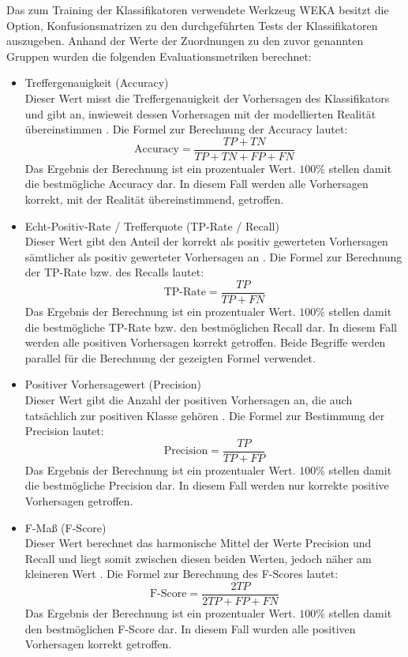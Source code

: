 Das zum Training der Klassifikatoren verwendete Werkzeug WEKA besitzt die Option, Konfusionsmatrizen zu den durchgeführten Tests der Klassifikatoren auszugeben. Anhand der Werte der Zuordnungen zu den zuvor genannten Gruppen wurden die folgenden Evaluationsmetriken berechnet: 

\begin{itemize}
\item Treffergenauigkeit (Accuracy)
\\Dieser Wert misst die Treffergenauigkeit der Vorhersagen des Klassifikators und gibt an, inwieweit dessen Vorhersagen mit der modellierten Realität übereinstimmen \cite{Sammut2017}. Die Formel zur Berechnung der Accuracy lautet:
\\\[\text{Accuracy} = \frac{TP+TN}{TP+TN+FP+FN}\]
Das Ergebnis der Berechnung ist ein prozentualer Wert. $100\%$ stellen damit die bestmögliche Accuracy dar. In diesem Fall werden alle Vorhersagen korrekt, mit der Realität übereinstimmend, getroffen.
\item Echt-Positiv-Rate / Trefferquote (TP-Rate / Recall)
\\Dieser Wert gibt den Anteil der korrekt als positiv gewerteten Vorhersagen sämtlicher als positiv gewerteter Vorhersagen an \cite{Alpaydin2010}. Die Formel zur Berechnung der TP-Rate bzw. des Recalls lautet:
\\\[\text{TP-Rate} = \frac{TP}{TP+FN}\]
Das Ergebnis der Berechnung ist ein prozentualer Wert. $100\%$ stellen damit die bestmögliche TP-Rate bzw. den bestmöglichen Recall dar. In diesem Fall werden alle positiven Vorhersagen korrekt getroffen. Beide Begriffe werden parallel für die Berechnung der gezeigten Formel verwendet.
\item Positiver Vorhersagewert (Precision)
\\ Dieser Wert gibt die Anzahl der positiven Vorhersagen an, die auch tatsächlich zur positiven Klasse gehören \cite{Sammut2017}. Die Formel zur Bestimmung der Precision lautet:
\\\[\text{Precision} = \frac{TP}{TP+FP}\]
Das Ergebnis der Berechnung ist ein prozentualer Wert. $100\%$ stellen damit die bestmögliche Precision dar. In diesem Fall werden nur korrekte positive Vorhersagen getroffen.
\item F-Maß (F-Score)
\\ Dieser Wert berechnet das harmonische Mittel der Werte Precision und Recall und liegt somit zwischen diesen beiden Werten, jedoch näher am kleineren Wert \cite{Sammut2017}. Die Formel zur Berechnung des F-Scores lautet:
\\\[\text{F-Score} = \frac{2TP}{2TP+FP+FN}\]
Das Ergebnis der Berechnung ist ein prozentualer Wert. $100\%$ stellen damit den bestmöglichen F-Score dar. In diesem Fall wurden alle positiven Vorhersagen korrekt getroffen.
\end{itemize}

